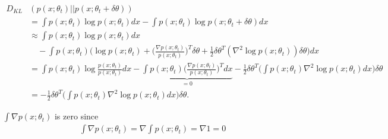 \begin{align*}
	D_{KL}&(p(x;\theta_t)||p(x;\theta_t+\delta \theta))\\ &= \int p(x;\theta_t)\log p(x;\theta_t) dx - \int p(x;\theta_t)\log p(x;\theta_t+\delta \theta) dx\\
	&\approx \int p(x;\theta_t)\log p(x;\theta_t) dx\\
	&\quad - \int p(x;\theta_t)\Bigg(\log p(x;\theta_t) + \Bigg(\frac{\nabla p(x;\theta_t)}{p(x;\theta_t)}\Bigg)^T \delta \theta + \frac{1}{2}\delta\theta^T (\nabla^2 \log p(x;\theta_t))\delta\theta \Bigg)dx\\
	&=\int p(x;\theta_t)\log\frac{ p(x;\theta_t)}{p(x;\theta_t)} dx - \underbrace{\int p(x;\theta_t)\Bigg(\frac{\nabla p(x;\theta_t)}{p(x;\theta_t)}\Bigg)^T dx }_{=0} - \frac{1}{2}\delta\theta^T\Bigg(\int p(x;\theta_t) \nabla^2 \log p(x;\theta_t) dx\Bigg) \delta\theta\\
	&= -\frac{1}{2}\delta\theta^T\Bigg(\int p(x;\theta_t) \nabla^2 \log p(x;\theta_t) dx\Bigg) \delta\theta.
\end{align*}

$\int \nabla p(x;\theta_t)$ is zero since 
\begin{align*}
\int \nabla p(x;\theta_t) = \nabla\int  p(x;\theta_t) = \nabla 1 = 0
\end{align*} 

